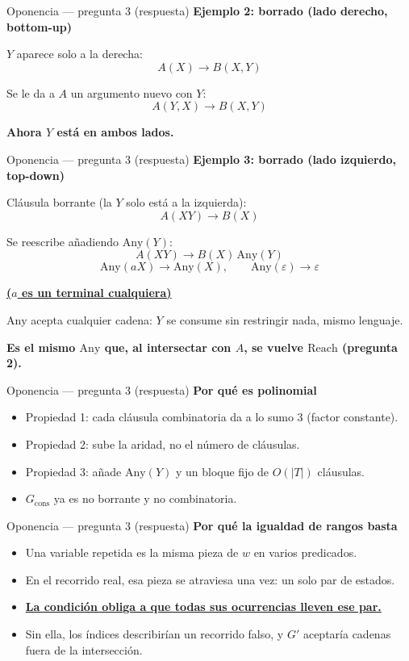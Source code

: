 \documentclass{beamer}
\newcommand{\destacar}[1]{\textbf{\underline{\textcolor{red!80!black}{#1}}}}
\newcommand{\azul}[1]{\textbf{\textcolor{blue!70!black}{#1}}}
\begin{document}
\begin{frame}{Oponencia --- pregunta 3 (respuesta)}
  \textbf{Ejemplo 2: borrado (lado derecho, bottom-up)}

  $Y$ aparece solo a la derecha:
  \[ A(X) \to B(X, Y) \]

  \pause
  Se le da a $A$ un argumento nuevo con $Y$:
  \[ A(Y, X) \to B(X, Y) \]

  \pause
  \azul{Ahora $Y$ está en ambos lados.}
\end{frame}

\begin{frame}{Oponencia --- pregunta 3 (respuesta)}
  \textbf{Ejemplo 3: borrado (lado izquierdo, top-down)}

  Cláusula borrante (la $Y$ solo está a la izquierda):
  \[ A(XY) \to B(X) \]

  \pause
  Se reescribe añadiendo $\mathrm{Any}(Y)$:
  \[ A(XY) \to B(X)\,\mathrm{Any}(Y) \]
  \[ \mathrm{Any}(aX)\to\mathrm{Any}(X), \qquad \mathrm{Any}(\varepsilon)\to\varepsilon \]
  \begin{center}{\small \destacar{($a$ es un terminal cualquiera)}}\end{center}

  \pause
  $\mathrm{Any}$ acepta cualquier cadena: $Y$ se consume sin restringir nada, mismo lenguaje.

  \pause
  \azul{Es el mismo $\mathrm{Any}$ que, al intersectar con $A$, se vuelve $\mathrm{Reach}$ (pregunta 2).}
\end{frame}

\begin{frame}{Oponencia --- pregunta 3 (respuesta)}
  \textbf{Por qué es polinomial}
  \begin{itemize}
    \item<1-> Propiedad 1: cada cláusula combinatoria da a lo sumo 3 (factor constante).
    \item<2-> Propiedad 2: sube la aridad, no el número de cláusulas.
    \item<3-> Propiedad 3: añade $\mathrm{Any}(Y)$ y un bloque fijo de $O(|T|)$ cláusulas.
    \item<4-> $G_{\mathrm{cons}}$ ya es no borrante y no combinatoria.
  \end{itemize}
\end{frame}

\begin{frame}{Oponencia --- pregunta 3 (respuesta)}
  \textbf{Por qué la igualdad de rangos basta}
  \begin{itemize}
    \item<1-> Una variable repetida es la misma pieza de $w$ en varios predicados.
    \item<2-> En el recorrido real, esa pieza se atraviesa una vez: un solo par de estados.
    \item<3-> \destacar{La condición obliga a que todas sus ocurrencias lleven ese par.}
    \item<4-> Sin ella, los índices describirían un recorrido falso, y $G'$ aceptaría cadenas fuera de la intersección.
  \end{itemize}
\end{frame}
\end{document}

